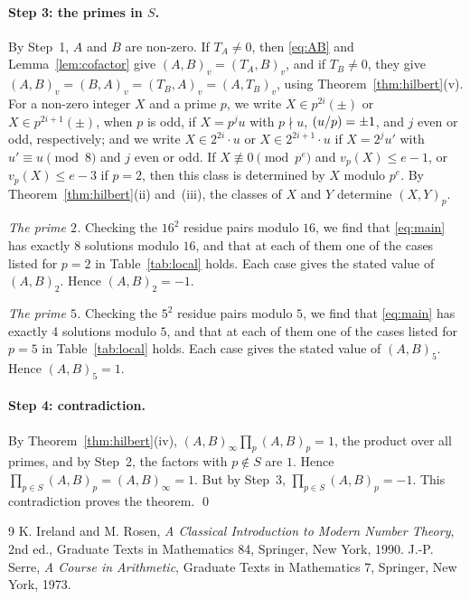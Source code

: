\documentclass[11pt]{article}
\newcommand{\leg}[2]{\mathchoice{\biggl(\dfrac{#1}{#2}\biggr)}{(#1/#2)}{(#1/#2)}{(#1/#2)}}
\begin{document}
\paragraph{Step 3: the primes in $S$.} By Step~1, $A$ and $B$ are non-zero. If $T_A\neq0$, then \eqref{eq:AB} and Lemma~\ref{lem:cofactor} give $(A,B)_v=(T_A,B)_v$, and if $T_B\neq0$, they give $(A,B)_v=(B,A)_v=(T_B,A)_v=(A,T_B)_v$, using Theorem~\ref{thm:hilbert}(v). For a non-zero integer $X$ and a prime $p$, we write $X\in p^{2i}(\pm)$ or $X\in p^{2i+1}(\pm)$, when $p$ is odd, if $X=p^ju$ with $p\nmid u$, $\leg{u}{p}=\pm1$, and $j$ even or odd, respectively; and we write $X\in2^{2i}\cdot u$ or $X\in2^{2i+1}\cdot u$ if $X=2^ju'$ with $u'\equiv u\pmod 8$ and $j$ even or odd. If $X\not\equiv0\pmod{p^e}$ and $v_p(X)\leq e-1$, or $v_p(X)\leq e-3$ if $p=2$, then this class is determined by $X$ modulo $p^e$. By Theorem~\ref{thm:hilbert}(ii) and~(iii), the classes of $X$ and $Y$ determine $(X,Y)_p$.

\emph{The prime $2$.} Checking the $16^2$ residue pairs modulo $16$, we find that \eqref{eq:main} has exactly 8 solutions modulo $16$, and that at each of them one of the cases listed for $p=2$ in Table~\ref{tab:local} holds. Each case gives the stated value of $(A,B)_{2}$. Hence $(A,B)_{2}=-1$.

\emph{The prime $5$.} Checking the $5^2$ residue pairs modulo $5$, we find that \eqref{eq:main} has exactly 4 solutions modulo $5$, and that at each of them one of the cases listed for $p=5$ in Table~\ref{tab:local} holds. Each case gives the stated value of $(A,B)_{5}$. Hence $(A,B)_{5}=1$.

\paragraph{Step 4: contradiction.} By Theorem~\ref{thm:hilbert}(iv), $(A,B)_\infty\prod_p(A,B)_p=1$, the product over all primes, and by Step~2, the factors with $p\notin S$ are $1$. Hence $\prod_{p\in S}(A,B)_p=(A,B)_\infty=1$. But by Step~3, $\prod_{p\in S}(A,B)_p=-1$. This contradiction proves the theorem.
\qed

\begin{thebibliography}{9}
 K. Ireland and M. Rosen, \emph{A Classical Introduction to Modern Number Theory}, 2nd ed., Graduate Texts in Mathematics 84, Springer, New York, 1990.
 J.-P. Serre, \emph{A Course in Arithmetic}, Graduate Texts in Mathematics 7, Springer, New York, 1973.
\end{thebibliography}
\end{document}
